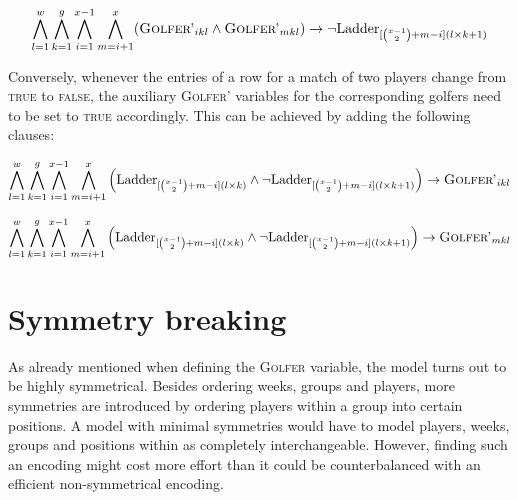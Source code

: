 \documentclass[a4paper]{scrartcl}
\begin{document}
\begin{equation}
\centering
    \bigwedge \limits_{l=1}^{w}
    \bigwedge \limits_{k=1}^{g}
    \bigwedge \limits_{i=1}^{x-1}
    \bigwedge \limits_{m=i+1}^{x}
    (\textsc{Golfer'}_{ikl} \wedge \textsc{Golfer'}_{mkl}) \to \neg \text{Ladder}_{[{x-1 \choose 2}+m-i](l \times k + 1)}
\end{equation}

Conversely, whenever the entries of a row for a match of two players change from \textsc{true} to \textsc{false}, the auxiliary \textsc{Golfer'} variables for the corresponding golfers need to be set to \textsc{true} accordingly. This can be achieved by adding the following clauses:

\begin{equation}
\centering
    \bigwedge \limits_{l=1}^{w}
    \bigwedge \limits_{k=1}^{g}
    \bigwedge \limits_{i=1}^{x-1}
    \bigwedge \limits_{m=i+1}^{x}
    \Big(
        \text{Ladder}_{
            [
                {x-1 \choose 2}
                +m-i
            ](l \times k)
        }
        \wedge
        \neg
        \text{Ladder}_{
            [
                {x-1 \choose 2}
                +m-i
            ](l \times k + 1)
        }
    \Big)
    \to
    \textsc{Golfer'}_{ikl}
\end{equation}

\begin{equation}
\centering
    \bigwedge \limits_{l=1}^{w}
    \bigwedge \limits_{k=1}^{g}
    \bigwedge \limits_{i=1}^{x-1}
    \bigwedge \limits_{m=i+1}^{x}
    \Big(
        \text{Ladder}_{
            [
                {x-1 \choose 2}
                +m-i
            ](l \times k)
        }
        \wedge
        \neg
        \text{Ladder}_{
            [
                {x-1 \choose 2}
                +m-i
            ](l \times k + 1)
        }
    \Big)
    \to
    \textsc{Golfer'}_{mkl}
\end{equation}

\section{Symmetry breaking}

As already mentioned when defining the \textsc{Golfer} variable, the model turns out to be highly symmetrical. Besides ordering weeks, groups and players, more symmetries are introduced by ordering players within a group into certain positions. A model with minimal symmetries would have to model players, weeks, groups and positions within as completely interchangeable. However, finding such an encoding might cost more effort than it could be counterbalanced with an efficient non-symmetrical encoding. 
\end{document}

